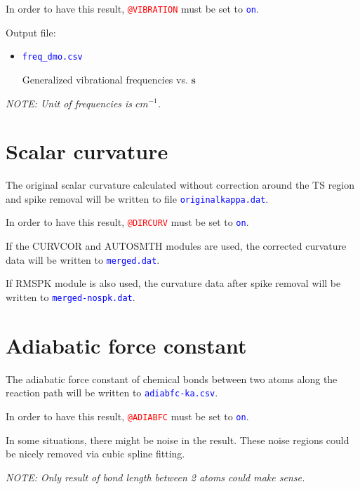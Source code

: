 In order to have this result, \texttt{\textcolor{red}{@VIBRATION}} must be set to  \texttt{\textcolor{blue}{on}}.

Output file:
\begin{itemize}
    \item \texttt{\textcolor{blue}{freq\_dmo.csv}}
    
    Generalized vibrational frequencies vs. $\mathbf{s}$

\end{itemize}

\textit{NOTE: Unit of frequencies is $cm^{-1}$.}


\section{Scalar curvature}

The original scalar curvature calculated without correction around the TS region and spike removal will be written to file \texttt{\textcolor{blue}{originalkappa.dat}}.

In order to have this result, \texttt{\textcolor{red}{@DIRCURV}} must be set to  \texttt{\textcolor{blue}{on}}.


If the CURVCOR and AUTOSMTH modules are used, the corrected curvature data will be written to \texttt{\textcolor{blue}{merged.dat}}.

If RMSPK module is also used, the curvature data after spike removal will be written to \texttt{\textcolor{blue}{merged-nospk.dat}}.




\section{Adiabatic force constant}
The adiabatic force constant of chemical bonds between two atoms along the reaction path will be written to \texttt{\textcolor{blue}{adiabfc-ka.csv}}.

In order to have this result, \texttt{\textcolor{red}{@ADIABFC}} must be set to  \texttt{\textcolor{blue}{on}}.


In some situations, there might be noise in the result. These noise regions could be nicely removed via cubic spline fitting.

\textit{NOTE: Only result of bond length between 2 atoms could make sense.}




